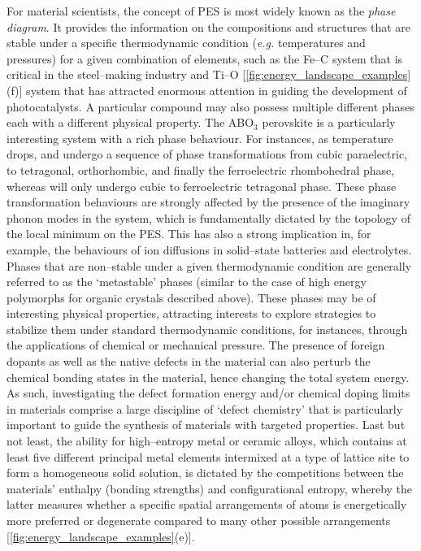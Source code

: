 For material scientists, the concept of PES is most widely known as the \textit{phase diagram}. It provides the information on the compositions and structures that are stable under a specific thermodynamic condition (\emph{e.g.} temperatures and pressures) for a given combination of elements, such as the Fe--C\cite{okamoto1992c} system that is critical in the steel--making industry and  Ti--O\cite{wahlbeck1966reinvestigation} [\cref{fig:energy_landscape_examples}(f)] system that has attracted enormous attention in guiding the development of photocatalysts. A particular compound may also possess multiple different phases each with a different physical property. The ABO$_3$ perovskite is a particularly interesting system with a rich phase behaviour. For instances, as temperature drops,  and  undergo a sequence of phase transformations from cubic paraelectric, to tetragonal, orthorhombic, and finally the ferroelectric rhombohedral  phase, whereas  will only undergo cubic to ferroelectric tetragonal phase.\cite{ravel1998local} These phase transformation behaviours are strongly affected by the presence of the imaginary phonon modes\cite{fleury1968soft,pallikara2022physical} in the system, which is fundamentally dictated by the topology of the local minimum on the PES. This has also a strong implication in, for example, the behaviours of ion diffusions in solid--state batteries and electrolytes.\cite{he2017origin,di2019superionic} Phases that are non--stable under a given thermodynamic condition are generally referred to as the `metastable' phases\cite{aykol2018thermodynamic,sun2016thermodynamic} (similar to the case of high energy polymorphs for organic crystals described above). These phases may be of interesting physical properties, attracting interests to explore strategies to stabilize them under standard thermodynamic conditions, for instances, through the applications of chemical\cite{eitel2002preparation,protesescu2015nanocrystals,tan2017chemical} or mechanical  pressure. The presence of foreign dopants as well as the native defects in the material can also perturb the chemical bonding states in the material, hence changing the total system energy. As such, investigating the defect formation energy and/or chemical doping limits in materials comprise a large discipline of `defect chemistry' that is particularly important to guide the synthesis of materials with targeted properties.\cite{freysoldt2014first,anand2022convergent,norby2004hydrogen,robertson2011limits,lany2007dopability} Last but not least, the ability for high--entropy metal\cite{george2019high} or ceramic\cite{oses2020high}
alloys, which contains at least five different principal metal elements intermixed at a type of lattice site to form a homogeneous solid solution, is dictated by the competitions between the materials' enthalpy (bonding strengths) and configurational entropy, whereby the latter measures whether a specific spatial arrangements of atoms is energetically more preferred or degenerate compared to many other possible arrangements [\cref{fig:energy_landscape_examples}(e)].


